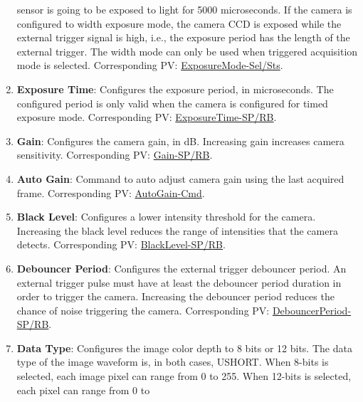 \documentclass[openany]{article}
\begin{document}
\begin{enumerate}
                        sensor is going to be exposed to light for 5000 microseconds. If the
                        camera is configured to width exposure mode, the camera CCD is 
                        exposed while the external trigger signal is high, i.e., the 
                        exposure period has the length of the external trigger. The width 
                        mode can only be used when triggered acquisition mode is selected. 
                        Corresponding PV: \hyperlink{pv:exp-mode}{ExposureMode-Sel/Sts}.
            \item \textbf{Exposure Time}: Configures the exposure period, in 
                        microseconds. The configured period is only valid when the camera is
                        configured for timed exposure mode.
                        Corresponding PV: \hyperlink{pv:exp-time}{ExposureTime-SP/RB}.
            \item \textbf{Gain}: Configures the camera gain, in dB. Increasing gain 
                        increases camera sensitivity. Corresponding PV: 
                        \hyperlink{pv:gain}{Gain-SP/RB}.
            \item \textbf{Auto Gain}: Command to auto adjust camera gain using the 
                        last acquired frame. Corresponding PV: 
                        \hyperlink{pv:auto-gain}{AutoGain-Cmd}.
            \item \textbf{Black Level}: Configures a lower intensity threshold for 
                        the camera. Increasing the black level reduces the range of 
                        intensities that the camera detects. Corresponding PV: 
                        \hyperlink{pv:black-level}{BlackLevel-SP/RB}.
            \item \textbf{Debouncer Period}: Configures the external trigger 
                        debouncer period. An external trigger pulse must have at least the 
                        debouncer period duration in order to trigger the camera. Increasing
                        the debouncer period reduces the chance of noise triggering the 
                        camera. Corresponding PV: 
                        \hyperlink{pv:debouncer-period}{DebouncerPeriod-SP/RB}.
            \item \textbf{Data Type}: Configures the image color depth to 8 bits or
                        12 bits. The data type of the image waveform is, in both cases, 
                        USHORT. When 8-bits is selected, each image pixel can range from 0 
                        to 255. When 12-bits is selected, each pixel can range from 0 to 

\end{enumerate}
\end{document}
